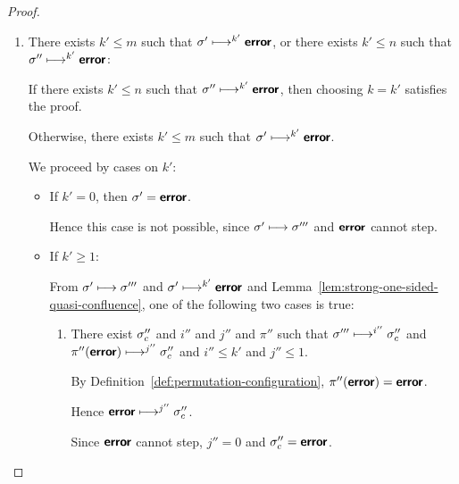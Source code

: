 \begin{proof}
\begin{enumerate}
\begin{itemize}
\begin{enumerate}
        Therefore, $\conf'' \ctxstepsto^{j'} \piprimeinv(\conf_c')
        \ctxstepsto^{k''} \error$.

        Hence $\conf'' \ctxstepsto^{j' + k''} \error$.

        Since $j' \leq n$ and $k'' \leq 1$, $j' + k'' \leq n + 1$.

        Hence choosing $k = j' + k''$ satisfies the proof.

      \end{enumerate}
    \end{itemize}

  \item There exists $k' \leq m$ such that $\sigma' \longmapsto^{k'}
    \textbf{\textsf{error}}$, or there exists $k' \leq n$ such that $\sigma''
    \longmapsto^{k'} \textbf{\textsf{error}}$:

    If there exists $k' \leq n$ such that $\sigma'' \longmapsto^{k'}
    \textbf{\textsf{error}}$, then choosing $k = k'$ satisfies the proof.

    Otherwise, there exists $k' \leq m$ such that $\sigma'
    \longmapsto^{k'} \textbf{\textsf{error}}$.

    We proceed by cases on $k'$:

    \begin{itemize}

    \item If $k' = 0$, then $\sigma' = \textbf{\textsf{error}}$.

      Hence this case is not possible, since $\sigma' \longmapsto
      \sigma'''$ and $\textbf{\textsf{error}}$ cannot step.

    \item If $k' \geq 1$:

      From $\sigma' \longmapsto \sigma'''$ and $\sigma' \longmapsto^{k'}
      \textbf{\textsf{error}}$ and Lemma~\ref{lem:strong-one-sided-quasi-confluence},
      one of the following two cases is true:

      \begin{enumerate}
      \item There exist $\sigma''_c$ and $i''$ and $j''$ and $\pi''$
        such that $\sigma''' \longmapsto^{i''} \sigma''_c$ and
        $\pi''(\textbf{\textsf{error}}) \longmapsto^{j''} \sigma''_c$ and $i'' \leq
        k'$ and $j'' \leq 1$.

        By Definition~\ref{def:permutation-configuration},
        $\pi''(\textbf{\textsf{error}}) = \textbf{\textsf{error}}$.

        Hence $\textbf{\textsf{error}} \longmapsto^{j''} \sigma''_c$.

        Since $\textbf{\textsf{error}}$ cannot step, $j'' = 0$ and $\sigma''_c =
        \textbf{\textsf{error}}$.


\end{enumerate}
\end{itemize}
\end{enumerate}
\end{proof}
